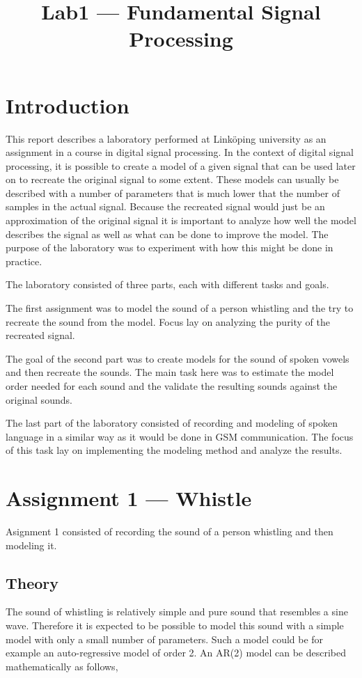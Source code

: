 \documentclass{IEEEtran}
\begin{document}
\title{Lab1 --- Fundamental Signal Processing}

\maketitle

\section{Introduction}
This report describes a laboratory performed at Linköping university as an
assignment in a course in digital signal processing. In the context of
digital signal processing, it is possible to create a model of a given
signal that can be used later on to recreate the original signal to some
extent. These models can usually be described with a number of parameters
that is much lower that the number of samples in the actual signal. Because
the recreated signal would just be an approximation of the original signal
it is important to analyze how well the model describes the signal as well
as what can be done to improve the model. The purpose of the laboratory was
to experiment with how this might be done in practice.

The laboratory consisted of three parts, each with different tasks and
goals.

The first assignment was to model the sound of a person whistling and the
try to recreate the sound from the model. Focus lay on analyzing the purity
of the recreated signal.

The goal of the second part was to create models for the sound of spoken
vowels and then recreate the sounds. The main task here was to estimate
the model order needed for each sound and the validate the resulting
sounds against the original sounds.

The last part of the laboratory consisted of recording and modeling of
spoken language in a similar way as it would be done in GSM communication.
The focus of this task lay on implementing the modeling method and analyze
the results.

\section{Assignment 1 --- Whistle}
Asignment 1 consisted of recording the sound of a person whistling and then
modeling it.

\subsection{Theory}
\label{sec:whistletheory}
The sound of whistling is relatively simple and pure sound that resembles
a sine wave. Therefore it is expected to be possible to model this sound
with a simple model with only a small number of parameters. Such a model
could be for example an auto-regressive model of order 2. An AR(2) model
can be described mathematically as follows,
\end{document}
